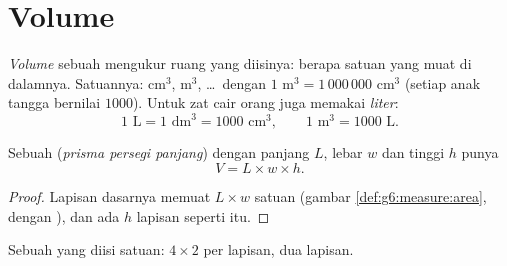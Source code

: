 \section{Volume}

\begin{definition}[Volume]\label{def:g6:measure:volume}
\emph{Volume} sebuah  mengukur ruang yang
diisinya: berapa  satuan yang muat di dalamnya. Satuannya: cm$^3$,
m$^3$, \dots\ dengan $1$ m$^3 = 1\,000\,000$ cm$^3$ (setiap anak tangga
bernilai $1000$). Untuk zat cair orang juga memakai \emph{liter}:
\[
1 \text{ L} = 1 \text{ dm}^3 = 1000 \text{ cm}^3,
\qquad
1 \text{ m}^3 = 1000 \text{ L}.
\]
\end{definition}

\begin{proposition}\label{prop:g6:measure:box}
Sebuah  (\emph{prisma persegi panjang}) dengan panjang $L$, lebar
$w$ dan tinggi $h$ punya 
\[
V = L \times w \times h .
\]
\end{proposition}

\begin{proof}
Lapisan dasarnya memuat $L \times w$  satuan (gambar
\cref{def:g6:measure:area}, dengan ), dan ada $h$ lapisan seperti
itu.
\end{proof}

\begin{omfigure}

{\small Sebuah  yang diisi  satuan: $4 \times 2$  per
lapisan, dua lapisan.}
\end{omfigure}

